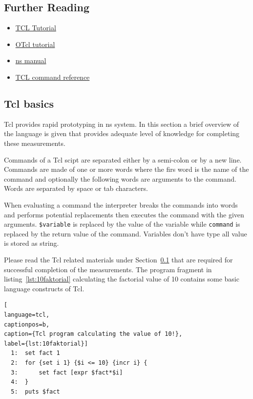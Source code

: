 \documentclass[a4paper]{article}
\begin{document}
\subsection{Further Reading}\label{sec:tcl}
\begin{itemize}
  \item \href{https://www.tcl.tk/man/tcl8.5/tutorial/tcltutorial.html}{TCL Tutorial}
  \item \href{https://www.isi.edu/nsnam/otcl/doc/tutorial.html}{OTcl tutorial}
  \item \href{http://www.isi.edu/nsnam/ns/ns-documentation.html}{ns manual}
  \item \href{http://alpha.tmit.bme.hu/meresek/tcl2.pdf}{TCL command reference}
\end{itemize}

\subsection{Tcl basics}

Tcl provides rapid prototyping in ns system. In this section a brief overview of the language is given that provides adequate level of knowledge for completing these measurements.

Commands of a Tcl scipt are separated either by a semi-colon or by a new line. Commands are made of one or more words where the firs word is the name of the command and optionally the following words are arguments to the command. Words are separated by space or tab characters.

When evaluating a command the interpreter breaks the commands into words and performs potential replacements then executes the command with the given arguments. \verb!$variable! is replaced by the value of the variable while \verb!command! is replaced by the return value of the command. Variables don't have type all value is stored as string.

Please read the Tcl related materials under Section~\ref{sec:tcl} that are required for successful completion of the measurements. The program fragment in listing~\ref{lst:10faktorial} calculating the factorial value of 10 contains some basic language constructs of Tcl.

\begin{lstlisting}[
language=tcl,
captionpos=b,
caption={Tcl program calculating the value of 10!},
label={lst:10faktorial}]
  1:  set fact 1
  2:  for {set i 1} {$i <= 10} {incr i} {
  3:      set fact [expr $fact*$i]
  4:  }
  5:  puts $fact
\end{lstlisting}
\end{document}
